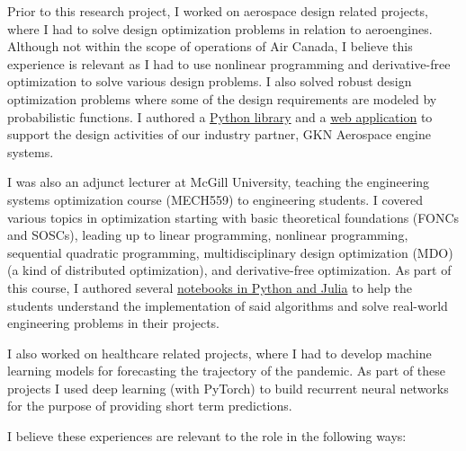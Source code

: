 \documentclass[12pt]{article} %
\begin{document}
Prior to this research project, I worked on aerospace design related projects, where I had to solve design optimization problems in relation to aeroengines. Although not within the scope of operations of Air Canada, I believe this experience is relevant as I had to use nonlinear programming and derivative-free optimization to solve various design problems. I also solved robust design optimization problems where some of the design requirements are modeled by probabilistic functions. I authored a \href{https://sed-group.github.io/mvmlib/index.html}{Python library} and a \href{https://github.com/khbalhandawi/scale_AM_webapp}{web application} to support the design activities of our industry partner, GKN Aerospace engine systems.

I was also an adjunct lecturer at McGill University, teaching the engineering systems optimization course (MECH559) to engineering students. I covered various topics in optimization starting with basic theoretical foundations (FONCs and SOSCs), leading up to linear programming, nonlinear programming, sequential quadratic programming, multidisciplinary design optimization (MDO) (a kind of distributed optimization), and derivative-free optimization. As part of this course, I authored several \href{https://github.com/khbalhandawi/MECH559_notebooks}{notebooks in Python and Julia} to help the students understand the implementation of said algorithms and solve real-world engineering problems in their projects.

I also worked on healthcare related projects, where I had to develop machine learning models for forecasting the trajectory of the pandemic. As part of these projects I used deep learning (with PyTorch) to build recurrent neural networks for the purpose of providing short term predictions.

I believe these experiences are relevant to the role in the following ways: 
\end{document}
